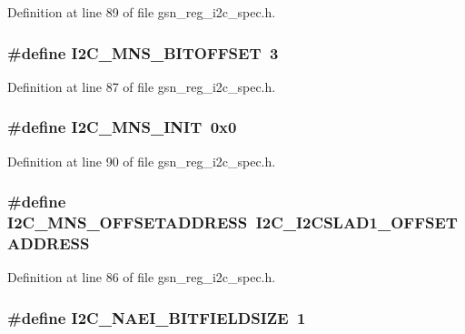 Definition at line 89 of file gsn\_\-reg\_\-i2c\_\-spec.h.

\hypertarget{a00558_a9a7286e83417c9f6a0d1173b140e4af6}{
\subsubsection[{I2C\_\-MNS\_\-BITOFFSET}]{\setlength{\rightskip}{0pt plus 5cm}\#define I2C\_\-MNS\_\-BITOFFSET~3}}
\label{a00558_a9a7286e83417c9f6a0d1173b140e4af6}


Definition at line 87 of file gsn\_\-reg\_\-i2c\_\-spec.h.

\hypertarget{a00558_a96d0655a4cb1eb8f742ae868fbd8e0f0}{
\subsubsection[{I2C\_\-MNS\_\-INIT}]{\setlength{\rightskip}{0pt plus 5cm}\#define I2C\_\-MNS\_\-INIT~0x0}}
\label{a00558_a96d0655a4cb1eb8f742ae868fbd8e0f0}


Definition at line 90 of file gsn\_\-reg\_\-i2c\_\-spec.h.

\hypertarget{a00558_a0406fc3fbcec4185b8b23409b1afdb57}{
\subsubsection[{I2C\_\-MNS\_\-OFFSETADDRESS}]{\setlength{\rightskip}{0pt plus 5cm}\#define I2C\_\-MNS\_\-OFFSETADDRESS~I2C\_\-I2CSLAD1\_\-OFFSETADDRESS}}
\label{a00558_a0406fc3fbcec4185b8b23409b1afdb57}


Definition at line 86 of file gsn\_\-reg\_\-i2c\_\-spec.h.

\hypertarget{a00558_a16a4029d2be924da5b0bb3e13500e727}{
\subsubsection[{I2C\_\-NAEI\_\-BITFIELDSIZE}]{\setlength{\rightskip}{0pt plus 5cm}\#define I2C\_\-NAEI\_\-BITFIELDSIZE~1}}
\label{a00558_a16a4029d2be924da5b0bb3e13500e727}


